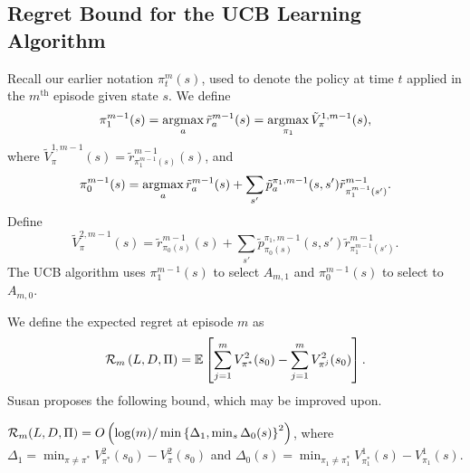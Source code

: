 \documentclass[11pt]{article}
\begin{document}
\subsection{Regret Bound for the UCB Learning Algorithm}
Recall our earlier notation $\pi_{t}^{m}(s)$, used to denote the policy at time $t$ applied in the $m^\text{th}$ episode given state $s$. We define
\[
	\pi_{1}^{m-1}(s) = \operatorname*{argmax}_{a} \tilde{r}_{a}^{m-1}(s) = \operatorname*{argmax}_{\pi_{1}} \tilde{V}_{\pi}^{1, m-1}(s),
\]
where $\tilde{V}_{\pi}^{1, m-1}(s) = \tilde{r}_{\pi_{1}^{m-1}(s)}^{m-1}(s)$, and
\[
	\pi_{0}^{m-1}(s) = \operatorname*{argmax}_{a} \tilde{r}_{a}^{m-1}(s) + \sum_{s'} \tilde{p}_{a}^{\pi_{1}, m-1}(s,s') \tilde{r}_{\pi_{1}^{m-1}(s')}^{m-1}.
\]
Define 
\[
	\tilde{V}_{\pi}^{2, m-1}(s) = \tilde{r}_{\pi_{0}(s)}^{m-1}(s) + \sum_{s'} \tilde{p}_{\pi_{0}(s)}^{\pi_{1}, m-1}(s,s') \tilde{r}_{\pi_{1}^{m-1}(s')}^{m-1}.
\]
The UCB algorithm uses $\pi_{1}^{m-1}(s)$ to select $A_{m,1}$ and $\pi_{0}^{m-1}(s)$ to select to $A_{m,0}$.

We define the expected regret at episode $m$ as 
\[
	\mathcal{R}_{m}\left(L, D, \Pi\right) = \mathbb{E}\left[\sum_{j=1}^{m} V_{\pi^{*}}^{2}(s_{0}) - \sum_{j=1}^{m} V_{\pi^{j}}^{2}(s_{0}) \right].
\]
Susan proposes the following bound, which may be improved upon.
\begin{proposition}
	$\mathcal{R}_{m}(L, D, \Pi) = O\left(\log(m) / \min\left\{\Delta_{1}, \min_{s}\Delta_{0}(s)\right\}^{2}\right)$, where $\Delta_{1} = \min_{\pi\neq\pi^{*}} V_{\pi^*}^{2}(s_{0}) - V_{\pi}^{2}(s_{0})$ and $\Delta_{0}(s) = \min_{\pi_{1}\neq \pi_{1}^{*}} V_{\pi_{1}^{*}}^{1}(s) - V_{\pi_{1}}^{1}(s)$.
\end{proposition}
\end{document}
